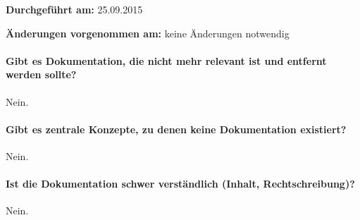 \textbf{Durchgeführt am:} 25.09.2015

\textbf{Änderungen vorgenommen am:} keine Änderungen notwendig

\paragraph{Gibt es Dokumentation, die nicht mehr relevant ist und entfernt werden sollte?}
Nein.

\paragraph{Gibt es zentrale Konzepte, zu denen keine Dokumentation existiert?}
Nein.

\paragraph{Ist die Dokumentation schwer verständlich (Inhalt, Rechtschreibung)?}
Nein.
